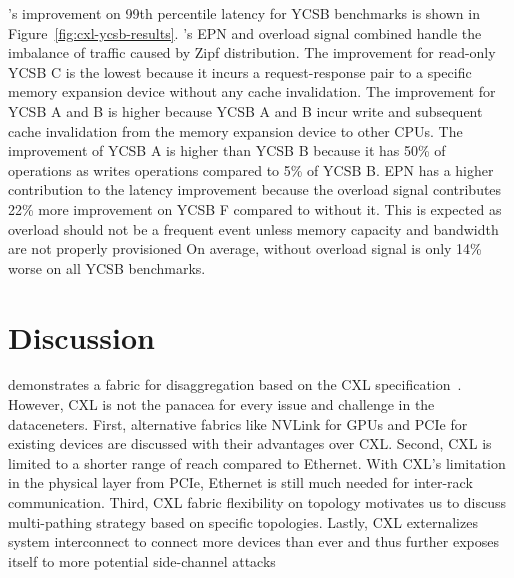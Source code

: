 \aurelia's improvement on 99th percentile latency for YCSB benchmarks is shown in Figure~\ref{fig:cxl-ycsb-results}.
%
\aurelia's EPN and overload signal combined handle the imbalance of traffic caused by Zipf distribution. 
%
The improvement for read-only YCSB C is the lowest because it incurs a request-response pair to a specific memory expansion device without any cache invalidation.
%
The improvement for YCSB A and B is higher because YCSB A and B incur write and subsequent cache invalidation from the memory expansion device to other CPUs.
%
The improvement of YCSB A is higher than YCSB B because it has 50\% of operations as writes operations compared to 5\% of YCSB B.  
%
EPN has a higher contribution to the latency improvement because 
the overload signal contributes 22\% more improvement on YCSB F compared to \aurelia without it.
%
This is expected as overload should not be a frequent event unless memory capacity and bandwidth are not properly provisioned
%
On average, \aurelia without overload signal is only 14\% worse on all YCSB benchmarks.

%

\section{Discussion}
\label{aurelia:sec:discussion}

\aurelia demonstrates a fabric for disaggregation based on the CXL specification~\cite{cxl-3-0-spec}. 
%
However, CXL is not the panacea for every issue and challenge in the dataceneters. 
%
First, 
alternative fabrics like NVLink for GPUs and PCIe for existing devices are discussed with their advantages over CXL.
% 
Second, CXL is limited to a shorter range of reach compared to Ethernet.
%
With CXL's limitation in the physical layer from PCIe, Ethernet is still much needed for inter-rack communication.
%
Third, CXL fabric flexibility on topology motivates us to discuss multi-pathing strategy based on specific topologies.
%
Lastly, CXL externalizes system interconnect to connect more devices than ever and thus further exposes itself to more potential side-channel attacks

